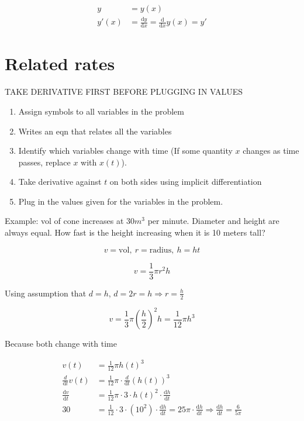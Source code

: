 \documentclass[
]{article}
\begin{document}
\begin{align*}
y &= y(x)
 \\
y'(x) &= \frac{\text{d}y}{\text{d}x} = \frac{\text{d}}{\text{d}x}y(x) = y'
\end{align*}



\section{Related rates}

TAKE DERIVATIVE FIRST BEFORE PLUGGING IN VALUES

\begin{enumerate}
\def\labelenumi{\arabic{enumi}.}
\item
  Assign symbols to all variables in the problem
\item
  Writes an eqn that relates all the variables
\item
  Identify which variables change with time (If some quantity $x$
  changes as time passes, replace $x$ with $x(t)$).
\item
  Take derivative against $t$ on both sides using implicit
  differentiation
\item
  Plug in the values given for the variables in the problem.
\end{enumerate}

Example: vol of cone increases at 30$m^{3}$ per minute. Diameter and
height are always equal. How fast is the height increasing when it is 10
meters tall?

$$v = \text{vol},\ r = \text{radius},\ h = ht$$

$$v = \frac{1}{3}\pi r^{2}h$$

Using assumption that $d = h$,
$d = 2r = h \Rightarrow r = \frac{h}{2}$

$$v = \frac{1}{3}\pi\left( \frac{h}{2} \right)^{2}h = \frac{1}{12}\pi h^{3}$$

Because both change with time

\begin{align*}
v(t) &= \frac{1}{12}\pi{h(t)}^{3}
 \\
\frac{d}{\text{d}t}v(t) &= \frac{1}{12}\pi \cdot \frac{d}{\text{d}t}\left( h(t) \right)^{3}
 \\
\frac{\text{d}v}{\text{d}t} &= \frac{1}{12}\pi \cdot 3 \cdot h(t)^{2} \cdot \frac{\text{d}h}{\text{d}t}
 \\
30 &= \frac{1}{12} \cdot 3 \cdot \left( 10^{2} \right) \cdot \frac{\text{d}h}{\text{d}t} = 25\pi \cdot \frac{\text{d}h}{\text{d}t} \Rightarrow \frac{\text{d}h}{\text{d}t} = \frac{6}{5\pi}
\end{align*}
\end{document}
